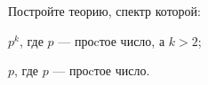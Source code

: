 Постройте теорию, спектр которой:
\begin{enumcyr}
    \item $p^k$, где $p$ --- проcтое число, а $k > 2$;
    \item $p$, где $p$ --- проcтое число.
\end{enumcyr}